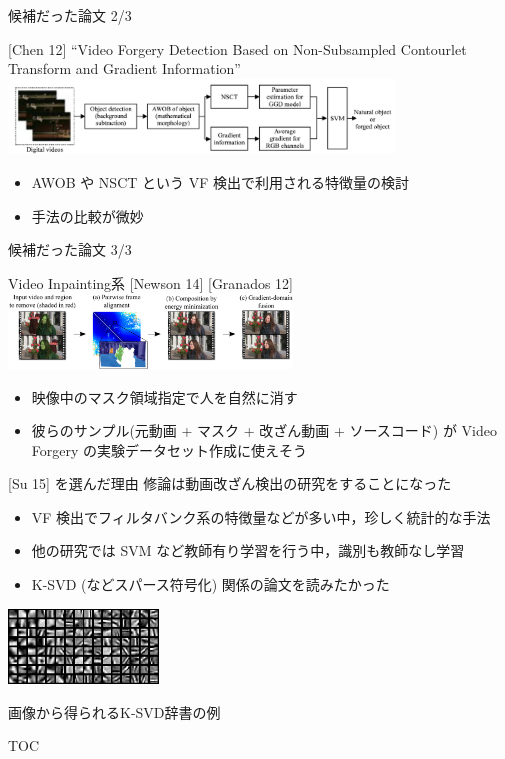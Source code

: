 \begin{frame}{候補だった論文 2/3}
\begin{block}{[Chen 12]}
``Video Forgery Detection Based on Non-Subsampled Contourlet Transform and Gradient Information''
\cite{Chen2012}
\includegraphics[height=2cm]{figure/chen0.png}
\end{block}
\begin{itemize}
    \item AWOB や NSCT という VF 検出で利用される特徴量の検討
    \item 手法の比較が微妙
\end{itemize}
\end{frame}


\begin{frame}{候補だった論文 3/3}
\begin{alertblock}{Video Inpainting系}
[Newson 14]
[Granados 12]
\includegraphics[height=2cm]{figure/granados.png}
\end{alertblock}
\begin{itemize}
    \item 映像中のマスク領域指定で人を自然に消す
    \item 彼らのサンプル(元動画 + マスク + 改ざん動画 + ソースコード)
    が Video Forgery の実験データセット作成に使えそう
\end{itemize}
\end{frame}


\begin{frame}{[Su 15] を選んだ理由}
修論は動画改ざん検出の研究をすることになった

\begin{itemize}
    \item VF 検出でフィルタバンク系の特徴量などが多い中，珍しく統計的な手法
    \item 他の研究では SVM など教師有り学習を行う中，識別も教師なし学習
    \item K-SVD (などスパース符号化) 関係の論文を読みたかった
\end{itemize}

\includegraphics[height=2cm]{figure/ksvd.png}

画像から得られるK-SVD辞書の例\cite{Murata2012}
\end{frame}


\begin{frame}{TOC}
\tableofcontents
\end{frame}
